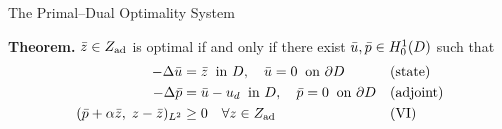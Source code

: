 \documentclass[main.tex]{subfiles}
\begin{document}
\begin{frame}[label=kkt]{The Primal--Dual Optimality System}
  \begin{hlbox}
    \textbf{Theorem.} $\bar z \in Z_{\rm ad}$ is optimal if and only if there exist $\bar u, \bar p \in H^1_0(D)$ such that
    \[
      \begin{aligned}
        -\Delta \bar u &= \bar z \;\;\text{in } D, \quad \bar u = 0 \;\;\text{on } \partial D && \text{(state)}\\
        -\Delta \bar p &= \bar u - u_d \;\;\text{in } D, \quad \bar p = 0 \;\;\text{on } \partial D && \text{(adjoint)}\\
        (\bar p + \alpha \bar z,\; z - \bar z)_{L^2} &\ge 0 \quad \forall z \in Z_{\rm ad} && \text{(VI)}
      \end{aligned}
    \]
  \end{hlbox}


  \vfill\hfill\hyperlink{lagrange}{}
\end{frame}
\end{document}
